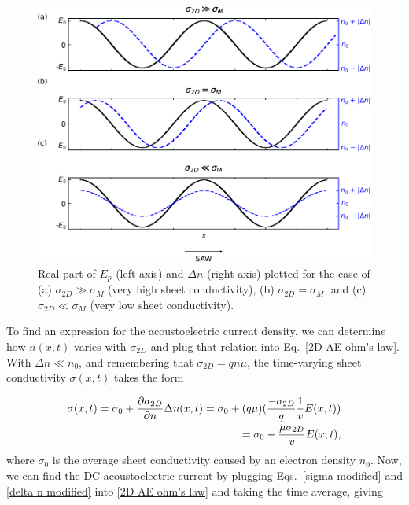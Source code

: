 \documentclass{beavtex_dub_edit}
\begin{document}
\begin{figure}
    \includegraphics[width = 1\textwidth]{piezoelectric field and delta n edited.pdf}
    \caption{Real part of $E_p$ (left axis) and $\Delta n$ (right axis) plotted for the case of (a) $\sigma_{2D} \gg \sigma_M$ (very high sheet conductivity), (b) $\sigma_{2D} = \sigma_M$, and (c) $\sigma_{2D} \ll \sigma_M$ (very low sheet conductivity).}
    \label{piezoelectric field and delta n}
\end{figure}

To find an expression for the acoustoelectric current density, we can determine how $n(x,t)$ varies with $\sigma_{2D}$ and plug that relation into Eq.\ \ref{2D AE ohm's law}. With $\Delta n \ll n_0$, and remembering that $\sigma_{2D} = q n \mu$, the time-varying sheet conductivity $\sigma(x,t)$ takes the form

\begin{equation}
    \begin{split}
        \sigma(x,t) = \sigma_0 + \pdv{\sigma_{2D}}{n} \Delta n(x,t) = \sigma_0 + (q \mu)(\frac{-\sigma_{2D}}{q} \frac{1}{v}E(x,t)) \\
        = \sigma_0 - \frac{\mu \sigma_{2D}}{v}E(x,t),
    \end{split}
    \label{sigma modified}
\end{equation}
where $\sigma_0$ is the average sheet conductivity caused by an electron density $n_0$. Now, we can find the DC acoustoelectric current by plugging Eqs.\ \ref{sigma modified} and \ref{delta n modified} into \ref{2D AE ohm's law} and taking the time average, giving
\end{document}
